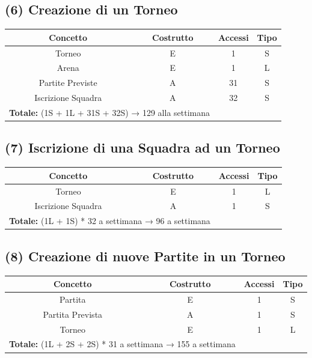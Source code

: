 \documentclass[a4paper,12pt]{report}
\begin{document}
\subsection*{(6) Creazione di un Torneo}
\begin{center}
	\begin{tabular}{|c|c|c|c|}
		\hline\rowcolor{pink}
		Concetto & Costrutto & Accessi & Tipo\\
		\hline\hline		
		Torneo & E & 1 & S\\
		Arena & E & 1 & L\\
		Partite Previste & A & 31 & S\\
		Iscrizione Squadra & A & 32 & S\\
		\hline
		\hline
		\multicolumn{2}{l}{%
			\textbf{Totale:} (1S + 1L + 31S + 32S) → 129 alla settimana} \\
		\hline
	\end{tabular}
\end{center}
\subsection*{(7) Iscrizione di una Squadra ad un Torneo}
\begin{center}
	\begin{tabular}{|c|c|c|c|}
		\hline\rowcolor{pink}
		Concetto & Costrutto & Accessi & Tipo\\
		\hline\hline		
		Torneo & E & 1 & L\\
		Iscrizione Squadra & A & 1 & S\\
		\hline
		\hline
		\multicolumn{2}{l}{%
			\textbf{Totale:} (1L + 1S) * 32 a settimana → 96 a settimana} \\
		\hline
	\end{tabular}
\end{center}
\subsection*{(8) Creazione di nuove Partite in un Torneo}
\begin{center}
	\begin{tabular}{|c|c|c|c|}
		\hline\rowcolor{pink}
		Concetto & Costrutto & Accessi & Tipo\\
		\hline\hline		
		Partita & E & 1 & S\\
		Partita Prevista & A & 1 & S\\
		Torneo & E & 1 & L\\
		\hline
		\hline
		\multicolumn{2}{l}{%
			\textbf{Totale:} (1L + 2S + 2S) * 31 a settimana → 155 a settimana} \\
		\hline
	\end{tabular}
\end{center}
\end{document}
